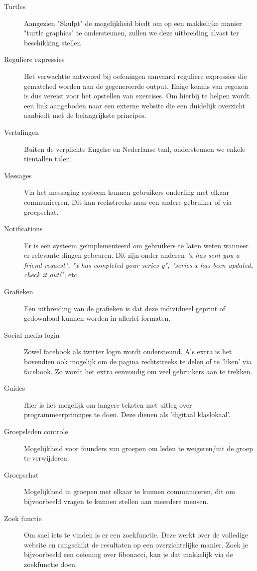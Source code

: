 \begin{description}
\item[Turtles] Aangezien "Skulpt" de mogelijkheid biedt om op een makkelijke manier "turtle graphics" te ondersteunen,
    zullen we deze uitbreiding alvast ter beschikking stellen.
\item[Reguliere expressies] Het verwachtte antwoord bij oefeningen aanvaard reguliere expressies die gematched worden
    aan de gegenereerde output. Enige kennis van regexen is dus vereist voor het opstellen van exercises. Om hierbij te
    helpen wordt een link aangeboden naar een externe website die een duidelijk overzicht aanbiedt met de belangrijkste
    principes.
\item[Vertalingen] Buiten de verplichte Engelse en Nederlanse taal, ondersteunen we enkele tientallen talen.
\item[Messages] Via het messaging systeem kunnen gebruikers onderling met elkaar communiceren. Dit kan rechstreeks naar een
    andere gebruiker of via groepschat.
\item[Notifications] Er is een systeem ge\"{i}mplementeerd om gebruikers te laten weten wanneer er relevante dingen gebeuren. Dit zijn onder anderen
    \textsl{"x has sent you a friend request", "x has completed your series y", "series x has been updated, check it out!"}, etc.
\item[Grafieken] Een uitbreiding van de grafieken is dat deze individueel geprint of gedownload kunnen worden in
    allerlei formaten.
\item[Social media login] Zowel facebook als twitter login wordt ondersteund. Als extra is het bovendien ook mogelijk om de pagina rechtstreeks
    te delen of te 'liken' via facebook. Zo wordt het extra eenvoudig om veel gebruikers aan te trekken.
\item[Guides] Hier is het mogelijk om langere teksten met uitleg over programmeerprincipes te doen. Deze dienen als 'digitaal klaslokaal'.
\item[Groepsleden controle] Mogelijkheid voor founders van groepen om leden te weigeren/uit de groep te verwijderen.
\item[Groepschat] Mogelijkheid in groepen met elkaar te kunnen communiceren, dit om bijvoorbeeld vragen te kunnen stellen aan meerdere mensen.
\item[Zoek functie] Om snel iets te vinden is er een zoekfunctie. Deze werkt over de volledige website en rangschikt de resultaten op een overzichtelijke manier.
    Zoek je bijvoorbeeld een oefening over fibonacci, kan je dat makkelijk via de zoekfunctie doen.

\end{description}
